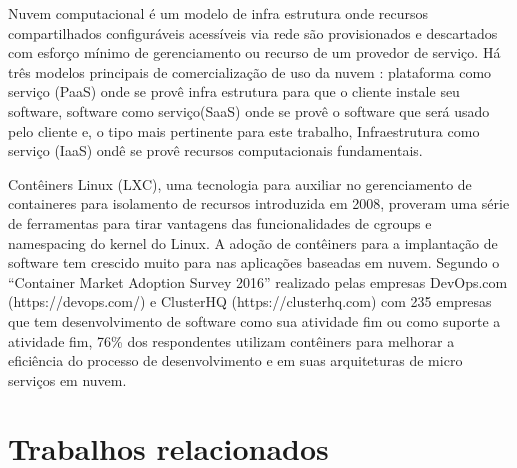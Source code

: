 \documentclass[conference]{IEEEtran}
\newcommand{\marcos}[1]{{\color{blue}{MARCOS: #1}}}
\begin{document}
\marcos{Discutir a importância da nuvem faz mais sentido na Introdução, no ``Contexto Geral''. Se o leitor chegou até aqui, ou ele está convencido da importância da nuvem (=seu contexto geral) e não é necessário lembrá-lo, ou ele parou de ler lá atrás, por não ter gostado do seu contexto geral... Informações sobre modelos de nuvem (deixando claro seu foco em IaaS) e contêineres são interessantes de incluir no documento, mas não acho que condizem com o título da seção... SUGESTÃO: Renomeie a seção para ``Fundamentação Teórica'' e explique nela, com sub-seções sucintas, os principais conceitos que interessam para o seu trabalho. NOTA: Isso normalmente é a última seção que se escreve, pois só no final você vai saber todos os conceitos necessários para o seu documento - HAMILTON: deixando por último}

Nuvem computacional é um modelo de infra estrutura onde recursos compartilhados configuráveis acessíveis via rede são provisionados e descartados com esforço mínimo de gerenciamento ou recurso de um provedor de serviço. \cite{NIST2011}
%
Há três modelos principais de comercialização de uso da nuvem \cite{NIST2011}: plataforma como serviço (PaaS) onde se provê infra estrutura para que o cliente instale seu software, software como serviço(SaaS) onde se provê o software que será usado pelo cliente e, o tipo mais pertinente para este trabalho, Infraestrutura como serviço (IaaS) ondê se provê recursos computacionais fundamentais.


Contêiners Linux (LXC), uma tecnologia para auxiliar no gerenciamento de containeres para isolamento de recursos introduzida em 2008, proveram uma série de ferramentas para tirar vantagens das funcionalidades de cgroups e namespacing do kernel do Linux. 
%
A adoção de contêiners para a implantação de software tem crescido muito para nas aplicações baseadas em nuvem. Segundo o ``Container Market Adoption Survey 2016'' realizado pelas empresas DevOps.com (https://devops.com/) e ClusterHQ (https://clusterhq.com) com 235 empresas que tem desenvolvimento de software como sua atividade fim ou como suporte a atividade fim, 76\% dos respondentes utilizam contêiners para melhorar a eficiência do processo de desenvolvimento e em suas arquiteturas de micro serviços em nuvem.

\section{Trabalhos relacionados}
\label{sec:related}
\end{document}
